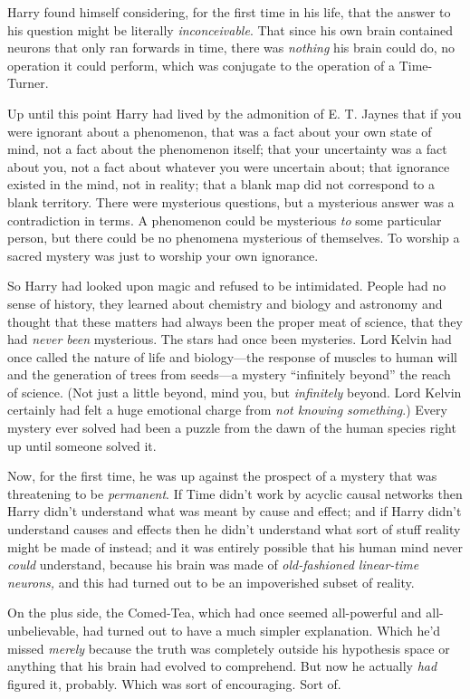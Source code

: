 Harry found himself considering, for the first time in his life, that the answer to his question might be literally \emph{inconceivable}. That since his own brain contained neurons that only ran forwards in time, there was \emph{nothing} his brain could do, no operation it could perform, which was conjugate to the operation of a Time-Turner.

Up until this point Harry had lived by the admonition of E. T. Jaynes that if you were ignorant about a phenomenon, that was a fact about your own state of mind, not a fact about the phenomenon itself; that your uncertainty was a fact about you, not a fact about whatever you were uncertain about; that ignorance existed in the mind, not in reality; that a blank map did not correspond to a blank territory. There were mysterious questions, but a mysterious answer was a contradiction in terms. A phenomenon could be mysterious \emph{to} some particular person, but there could be no phenomena mysterious of themselves. To worship a sacred mystery was just to worship your own ignorance.

So Harry had looked upon magic and refused to be intimidated. People had no sense of history, they learned about chemistry and biology and astronomy and thought that these matters had always been the proper meat of science, that they had \emph{never been} mysterious. The stars had once been mysteries. Lord Kelvin had once called the nature of life and biology—the response of muscles to human will and the generation of trees from seeds—a mystery “infinitely beyond” the reach of science. (Not just a little beyond, mind you, but \emph{infinitely} beyond. Lord Kelvin certainly had felt a huge emotional charge from \emph{not knowing something}.) Every mystery ever solved had been a puzzle from the dawn of the human species right up until someone solved it.

Now, for the first time, he was up against the prospect of a mystery that was threatening to be \emph{permanent}. If Time didn’t work by acyclic causal networks then Harry didn’t understand what was meant by cause and effect; and if Harry didn’t understand causes and effects then he didn’t understand what sort of stuff reality might be made of instead; and it was entirely possible that his human mind never \emph{could} understand, because his brain was made of \emph{old-fashioned linear-time neurons,} and this had turned out to be an impoverished subset of reality.

On the plus side, the Comed-Tea, which had once seemed all-powerful and all-unbelievable, had turned out to have a much simpler explanation. Which he’d missed \emph{merely} because the truth was completely outside his hypothesis space or anything that his brain had evolved to comprehend. But now he actually \emph{had} figured it, probably. Which was sort of encouraging. Sort of.

